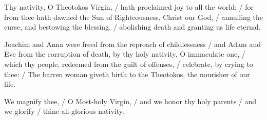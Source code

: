 \documentclass{article}
\begin{document}
%
%
Thy nativity, O Theotokos Virgin, /
hath proclaimed joy to all the world; /
for from thee hath dawned the Sun of Righteousness, Christ our God, /
annulling the curse, and bestowing the blessing, /
abolishing death and granting us life eternal.


%
Joachim and Anna were freed from the reproach of childlessness /
and Adam and Eve from the corruption of death, by thy holy nativity, O immaculate one, /
which thy people, redeemed from the guilt of offenses, /
celebrate, by crying to thee: /
The barren woman giveth birth to the Theotokos, the nourisher of our life.

%
We magnify thee, /
O Most-holy Virgin, /
and we honor thy holy parents /
and we glorify /
thine all-glorious nativity.
\end{document}
